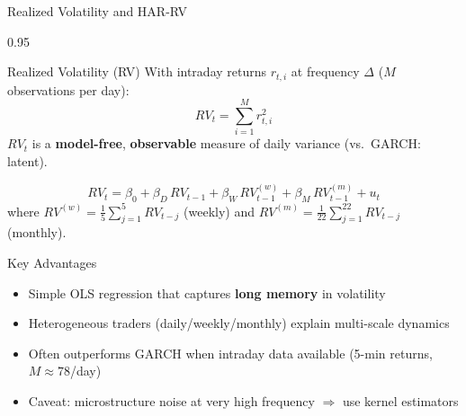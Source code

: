 \documentclass[9pt, aspectratio=169, t]{beamer}
\begin{document}
\begin{frame}{Realized Volatility and HAR-RV}
    \begin{cminipage}{0.95\textwidth}
    \scriptsize
    \setlength{\abovedisplayskip}{2pt}\setlength{\belowdisplayskip}{2pt}
    \vspace{-0.3cm}
    \begin{block}{Realized Volatility (RV)}
        With intraday returns $r_{t,i}$ at frequency $\Delta$ ($M$ observations per day):
        \[
            RV_t = \sum_{i=1}^{M} r_{t,i}^2
        \]
        $RV_t$ is a \textbf{model-free}, \textbf{observable} measure of daily variance (vs.\ GARCH: latent).
    \end{block}
    \vspace{-0.2cm}
    \begin{defn}
        \[
            RV_t = \beta_0 + \beta_D \, RV_{t-1} + \beta_W \, RV_{t-1}^{(w)} + \beta_M \, RV_{t-1}^{(m)} + u_t
        \]
        where $RV^{(w)} = \frac{1}{5}\sum_{j=1}^{5} RV_{t-j}$ (weekly) and $RV^{(m)} = \frac{1}{22}\sum_{j=1}^{22} RV_{t-j}$ (monthly).
    \end{defn}
    \vspace{-0.15cm}
    \begin{alertblock}{Key Advantages}
        \begin{itemize}\setlength{\itemsep}{0pt}
            \item Simple OLS regression that captures \textbf{long memory} in volatility
            \item Heterogeneous traders (daily/weekly/monthly) explain multi-scale dynamics
            \item Often outperforms GARCH when intraday data available (5-min returns, $M \approx 78$/day)
            \item Caveat: microstructure noise at very high frequency $\Rightarrow$ use kernel estimators
        \end{itemize}
    \end{alertblock}
    \end{cminipage}
\end{frame}
\end{document}
